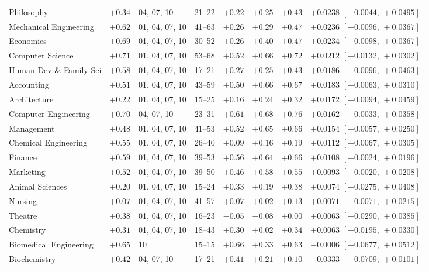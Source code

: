 \documentclass[11pt]{article}
\begin{document}
{\begin{longtable}{@{}>{\raggedright\arraybackslash}p{4.0cm}clccccl@{}}
Philosophy & ${+}0.34$ & 04, 07, 10 & 21--22 & ${+}0.22$ & ${+}0.25$ & ${+}0.43$ & ${+}0.0238$ $[{-}0.0044,\,{+}0.0495]$ \\
Mechanical Engineering & ${+}0.62$ & 01, 04, 07, 10 & 41--63 & ${+}0.26$ & ${+}0.29$ & ${+}0.47$ & ${+}0.0236$ $[{+}0.0096,\,{+}0.0367]$ \\
Economics & ${+}0.69$ & 01, 04, 07, 10 & 30--52 & ${+}0.26$ & ${+}0.40$ & ${+}0.47$ & ${+}0.0234$ $[{+}0.0098,\,{+}0.0367]$ \\
Computer Science & ${+}0.71$ & 01, 04, 07, 10 & 53--68 & ${+}0.52$ & ${+}0.66$ & ${+}0.72$ & ${+}0.0212$ $[{+}0.0132,\,{+}0.0302]$ \\
Human Dev \& Family Sci & ${+}0.58$ & 01, 04, 07, 10 & 17--21 & ${+}0.27$ & ${+}0.25$ & ${+}0.43$ & ${+}0.0186$ $[{-}0.0096,\,{+}0.0463]$ \\
Accounting & ${+}0.51$ & 01, 04, 07, 10 & 43--59 & ${+}0.50$ & ${+}0.66$ & ${+}0.67$ & ${+}0.0183$ $[{+}0.0063,\,{+}0.0310]$ \\
Architecture & ${+}0.22$ & 01, 04, 07, 10 & 15--25 & ${+}0.16$ & ${+}0.24$ & ${+}0.32$ & ${+}0.0172$ $[{-}0.0094,\,{+}0.0459]$ \\
Computer Engineering & ${+}0.70$ & 04, 07, 10 & 23--31 & ${+}0.61$ & ${+}0.68$ & ${+}0.76$ & ${+}0.0162$ $[{-}0.0033,\,{+}0.0358]$ \\
Management & ${+}0.48$ & 01, 04, 07, 10 & 41--53 & ${+}0.52$ & ${+}0.65$ & ${+}0.66$ & ${+}0.0154$ $[{+}0.0057,\,{+}0.0250]$ \\
Chemical Engineering & ${+}0.55$ & 01, 04, 07, 10 & 26--40 & ${+}0.09$ & ${+}0.16$ & ${+}0.19$ & ${+}0.0112$ $[{-}0.0067,\,{+}0.0305]$ \\
Finance & ${+}0.59$ & 01, 04, 07, 10 & 39--53 & ${+}0.56$ & ${+}0.64$ & ${+}0.66$ & ${+}0.0108$ $[{+}0.0024,\,{+}0.0196]$ \\
Marketing & ${+}0.52$ & 01, 04, 07, 10 & 39--50 & ${+}0.46$ & ${+}0.58$ & ${+}0.55$ & ${+}0.0093$ $[{-}0.0020,\,{+}0.0208]$ \\
Animal Sciences & ${+}0.20$ & 01, 04, 07, 10 & 15--24 & ${+}0.33$ & ${+}0.19$ & ${+}0.38$ & ${+}0.0074$ $[{-}0.0275,\,{+}0.0408]$ \\
Nursing & ${+}0.07$ & 01, 04, 07, 10 & 41--57 & ${+}0.07$ & ${+}0.02$ & ${+}0.13$ & ${+}0.0071$ $[{-}0.0071,\,{+}0.0215]$ \\
Theatre & ${+}0.38$ & 01, 04, 07, 10 & 16--23 & ${-}0.05$ & ${-}0.08$ & ${+}0.00$ & ${+}0.0063$ $[{-}0.0290,\,{+}0.0385]$ \\
Chemistry & ${+}0.31$ & 01, 04, 07, 10 & 18--43 & ${+}0.30$ & ${+}0.02$ & ${+}0.34$ & ${+}0.0063$ $[{-}0.0195,\,{+}0.0330]$ \\
Biomedical Engineering & ${+}0.65$ & 10 & 15--15 & ${+}0.66$ & ${+}0.33$ & ${+}0.63$ & ${-}0.0006$ $[{-}0.0677,\,{+}0.0512]$ \\
Biochemistry & ${+}0.42$ & 04, 07, 10 & 17--21 & ${+}0.41$ & ${+}0.21$ & ${+}0.10$ & ${-}0.0333$ $[{-}0.0709,\,{+}0.0101]$ \\
\end{longtable}
}
\end{document}
